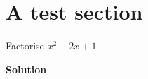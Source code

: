 \documentclass{article}
\newcommand\Solution{\par\textbf{\textsf{Solution}}\par\medskip}
\begin{document}
\section{A test section}
\begin{myexample}{Factorise $x^2-2x+1$}
\Solution
 \lipsum[4]
\end{myexample}
\end{document}

